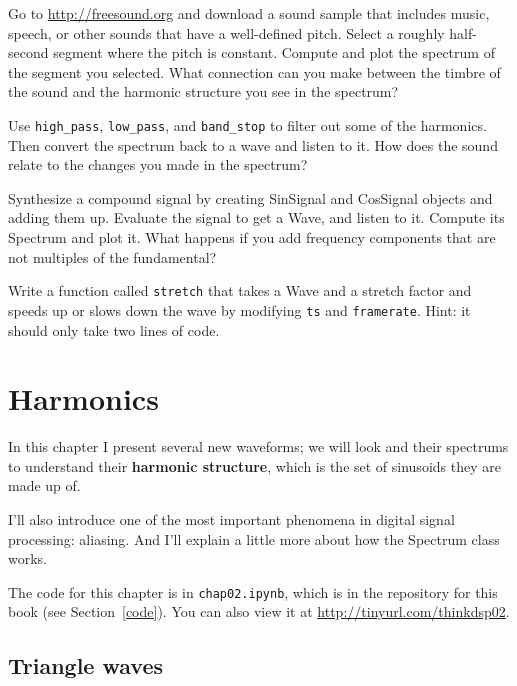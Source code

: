 \documentclass[12pt]{book} \usepackage[width=5.5in,height=8.5in, hmarginratio=3:2,vmarginratio=1:1]{geometry}
\begin{document}
\begin{exercise} Go to \url{http://freesound.org} and download a sound sample that includes music, speech, or other sounds that have a well-defined pitch. Select a roughly half-second segment where the pitch is constant. Compute and plot the spectrum of the segment you selected. What connection can you make between the timbre of the sound and the harmonic structure you see in the spectrum? 

Use \verb"high_pass", \verb"low_pass", and \verb"band_stop" to filter out some of the harmonics. Then convert the spectrum back to a wave and listen to it. How does the sound relate to the changes you made in the spectrum? \end{exercise} 

\begin{exercise} Synthesize a compound signal by creating SinSignal and CosSignal objects and adding them up. Evaluate the signal to get a Wave, and listen to it. Compute its Spectrum and plot it. What happens if you add frequency components that are not multiples of the fundamental? \end{exercise} 

\begin{exercise} Write a function called {\tt stretch} that takes a Wave and a stretch factor and speeds up or slows down the wave by modifying {\tt ts} and {\tt framerate}. Hint: it should only take two lines of code. \end{exercise} 

\chapter{Harmonics} \label{harmonics} 

In this chapter I present several new waveforms; we will look and their spectrums to understand their {\bf harmonic structure}, which is the set of sinusoids they are made up of. 

I'll also introduce one of the most important phenomena in digital signal processing: aliasing. And I'll explain a little more about how the Spectrum class works. 

The code for this chapter is in {\tt chap02.ipynb}, which is in the repository for this book (see Section~\ref{code}). You can also view it at \url{http://tinyurl.com/thinkdsp02}. 

\section{Triangle waves} \label{triangle} 
\end{document}
